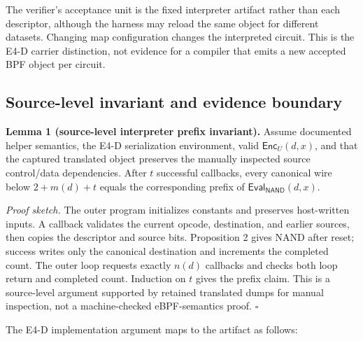 \documentclass[conference]{IEEEtran}
\begin{document}
The verifier's acceptance unit is the fixed interpreter artifact rather than each descriptor, although the harness may reload the same object for different datasets. Changing map configuration changes the interpreted circuit. This is the E4-D carrier distinction, not evidence for a compiler that emits a new accepted BPF object per circuit.

\subsection{Source-level invariant and evidence boundary}

\medskip
\noindent\textbf{Lemma 1 (source-level interpreter prefix invariant).}
Assume documented helper semantics, the E4-D serialization environment, valid $\mathsf{Enc}_U(d,x)$, and that the captured translated object preserves the manually inspected source control/data dependencies. After $t$ successful callbacks, every canonical wire below $2+m(d)+t$ equals the corresponding prefix of $\mathsf{Eval}_{\mathsf{NAND}}(d,x)$.

\emph{Proof sketch.} The outer program initializes constants and preserves host-written inputs. A callback validates the current opcode, destination, and earlier sources, then copies the descriptor and source bits. Proposition 2 gives NAND after reset; success writes only the canonical destination and increments the completed count. The outer loop requests exactly $n(d)$ callbacks and checks both loop return and completed count. Induction on $t$ gives the prefix claim. This is a source-level argument supported by retained translated dumps for manual inspection, not a machine-checked eBPF-semantics proof. \hfill$\square$

The E4-D implementation argument maps to the artifact as follows:
\end{document}

